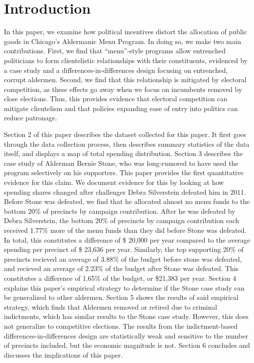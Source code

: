 \section*{Introduction}

In this paper, we examine how political incentives distort the allocation of public goods in Chicago's Aldermanic Menu Program.
In doing so, we make two main contributions.
First, we find that ``menu''-style programs allow entrenched politicians to form clientelistic relationships with their constituents, evidenced by a case study and a differences-in-differences design focusing on entrenched, corrupt aldermen.
Second, we find that this relationship is mitigated by electoral competition, as these effects go away when we focus on incumbents removed by close elections. 
Thus, this provides evidence that electoral competition can mitigate clientelism and that policies expanding ease of entry into politics can reduce patronage.

Section 2 of this paper describes the dataset collected for this paper. 
It first goes through the data collection process, then describes summary statistics of the data itself, and displays a map of total spending distribution.
Section 3 describes the case study of Alderman Bernie Stone, who was long-rumored to have used the program selectively on his supporters.
This paper provides the first quantitative evidence for this claim.
We document evidence for this by looking at how spending shares changed after challenger Debra Silverstein defeated him in 2011. 
Before Stone was defeated, we find that he allocated almost no menu funds to the bottom 20\% of precincts by campaign contribution. 
After he was defeated by Debra Silverstein, the bottom 20\% of precincts by campaign contribution each received 1.77\% more of the menu funds than they did before Stone was defeated.
In total, this constitutes a difference of \$ 20,000 per year compared to the average spending per precinct of \$ 23,636 per year. 
Similarly, the top supporting 20\% of precincts recieved an average of 3.88\% of the budget before stone was defeated, and recieved an average of 2.23\% of the budget after Stone was defeated. 
This constitutes a difference of 1.65\% of the budget, or \$21,383 per year.
Section 4 explains this paper's empirical strategy to determine if the Stone case study can be generalized to other aldermen.
Section 5 shows the results of said empirical strategy, which finds that Aldermen removed or retired due to criminal indictments, which has similar results to the Stone case study. 
However, this does not generalize to competitive elections.
The results from the indictment-based differences-in-differences design are statistically weak and sensitive to the number of precincts included, but the economic magnitude is not. 
Section 6 concludes and discusses the implications of this paper.

